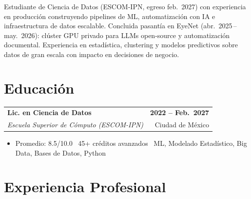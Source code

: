 \documentclass[9.5pt, letterpaper]{article}
\makeatletter
\newcommand{\entryheader}[4]{%
  \noindent
  \begin{tabularx}{\linewidth}{@{}X r@{}}
    {\normalsize\bfseries\color{primary} #1} & {\small\bfseries\color{accent} #2} \\[-1pt]
    {\small\color{textdark}\textit{#3}} & {\footnotesize\color{textlight} #4}
  \end{tabularx}
  \vspace{1pt}
}
\makeatother
\begin{document}
\enlargethispage{3.5cm}

\vspace{1.6cm}

{\small\color{textdark}
Estudiante de Ciencia de Datos (ESCOM-IPN, egreso feb.\ 2027) con experiencia en producci\'on
construyendo pipelines de ML, automatizaci\'on con IA e infraestructura de datos escalable.
Concluida pasant\'ia en EyeNet \href{https://dvillagrans.dev/projects/eyenet}{\color{accent}\faExternalLink*} (abr.\ 2025\,--\,may.\ 2026): cl\'uster GPU privado para LLMs
open-source y automatizaci\'on documental. Experiencia en estad\'istica, clustering y modelos
predictivos sobre datos de gran escala con impacto en decisiones de negocio.
}

\section{Educaci\'on}
\entryheader
  {Lic. en Ciencia de Datos}
  {2022 -- Feb.\ 2027}
  {Escuela Superior de C\'omputo (ESCOM-IPN)}
  {Ciudad de M\'exico}
\begin{itemize}
  \item Promedio: 8.5/10.0 \textbullet\ 45+ cr\'editos avanzados \textbullet\ ML, Modelado Estad\'istico, Big Data, Bases de Datos, Python
\end{itemize}

\section{Experiencia Profesional}
\end{document}
